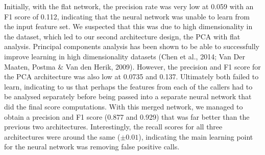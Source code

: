\documentclass{article}
\begin{document}
Initially, with the flat network, the precision rate was very low at 0.059 with an F1 score of 0.112, indicating that the neural network was unable to learn from the input feature set. We suspected that this was due to high dimensionality in the dataset, which led to our second architecture design, the PCA with flat analysis. Principal components analysis has been shown to be able to successfully improve learning in high dimensionality datasets (Chen et al., 2014; Van Der Maaten, Postma \& Van den Herik, 2009). However, the precision and F1 score for the PCA architecture was also low at 0.0735 and 0.137. Ultimately both failed to learn, indicating to us that perhaps the features from each of the callers had to be analysed separately before being passed into a separate neural network that did the final score computations. With this merged network, we managed to obtain a precision and F1 score (0.877 and 0.929) that was far better than the previous two architectures. Interestingly, the recall scores for all three architectures were around the same ($\pm 0.01$), indicating the main learning point for the neural network was removing false positive calls.
\end{document}
